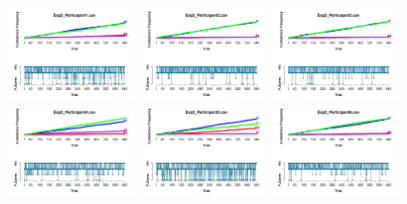 \begin{figure}[th]
\centering
\includegraphics[width=0.30\textwidth]{Figures/Outcome_Exp2_P1} \includegraphics[width=0.30\textwidth]{Figures/Outcome_Exp2_P2} \includegraphics[width=0.30\textwidth]{Figures/Outcome_Exp2_P3}
\includegraphics[width=0.30\textwidth]{Figures/Outcome_Exp2_P4} \includegraphics[width=0.30\textwidth]{Figures/Outcome_Exp2_P5} \includegraphics[width=0.30\textwidth]{Figures/Outcome_Exp2_P6}

\end{figure}

